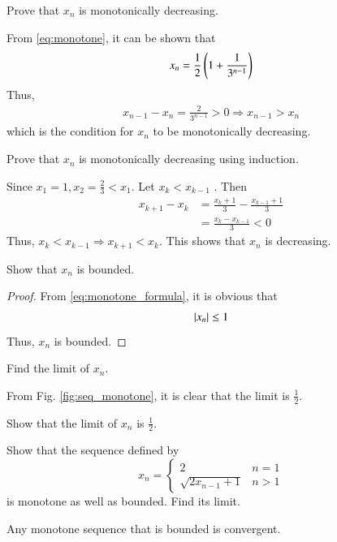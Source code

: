 \documentclass[journal,12pt,twocolumn]{IEEEtran}
\begin{document}
\begin{problem}
Prove that $x_n$ is monotonically decreasing.
\end{problem}
\proof From \eqref{eq:monotone}, it can be shown that
\begin{align}
\label{eq:monotone_formula}
x_n  = \frac{1}{2}\left(1 + \frac{1}{3^{n-1}}\right)
\end{align}
Thus,
\begin{align}
x_{n-1} - x_n = \frac{2}{3^{n-1}} > 0 \Rightarrow x_{n-1} > x_{n}
\end{align}
which is the condition for $x_n$ to be monotonically decreasing.
\begin{problem}
Prove that $x_n$ is monotonically decreasing using induction.
\end{problem}
\proof Since $x_1 = 1, x_2 = \frac{2}{3} < x_1$. Let $x_k < x_{k-1}$ . Then
%
\begin{align}
x_{k+1} - x_k &= \frac{x_k+1}{3}-\frac{x_{k-1}+1}{3}
\\
&= \frac{x_k - x_{k-1}}{3} < 0
\end{align}
%
Thus, $x_k < x_{k-1} \Rightarrow x_{k+1} < x_k$.  This shows that $x_n$ is decreasing.
\begin{problem}
Show that $x_n$ is bounded.
\end{problem}
\begin{proof}
From \eqref{eq:monotone_formula}, it is obvious that 
\begin{align}
\left\vert x_n\right\vert \le 1
\end{align}
Thus, $x_n$ is bounded.
\end{proof}
\begin{problem}
Find the limit of $x_n$.
\end{problem}
\solution From Fig. \ref{fig:seq_monotone}, it is clear that the limit is $\frac{1}{2}$.
\begin{problem}
Show that the limit of $x_n$ is $\frac{1}{2}$.
\end{problem}
\begin{problem}
Show that the sequence defined by
%
\begin{equation}
x_n
=
\begin{cases}
2 & n = 1
\\
\sqrt{2x_{n-1}+1} & n > 1
\end{cases}
\end{equation}
%
is monotone as well as bounded.  Find its limit.
\end{problem}
\begin{proposition}
Any monotone sequence that is bounded is convergent.
\end{proposition}
\end{document}

